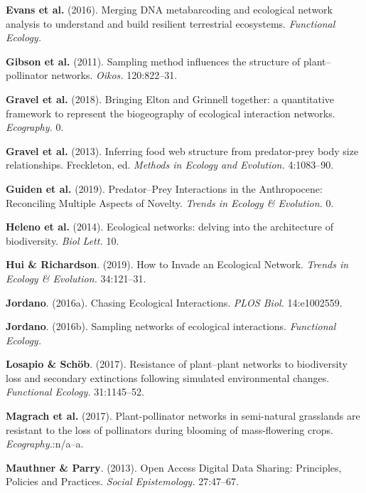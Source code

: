 \leavevmode\hypertarget{ref-EvanKits16}{}%
\textbf{Evans et al.} (2016). Merging DNA metabarcoding and ecological
network analysis to understand and build resilient terrestrial
ecosystems. \emph{Functional Ecology.}

\leavevmode\hypertarget{ref-GibsKnot11}{}%
\textbf{Gibson et al.} (2011). Sampling method influences the structure
of plant--pollinator networks. \emph{Oikos.} 120:822--31.

\leavevmode\hypertarget{ref-GravBais18}{}%
\textbf{Gravel et al.} (2018). Bringing Elton and Grinnell together: a
quantitative framework to represent the biogeography of ecological
interaction networks. \emph{Ecography.} 0.

\leavevmode\hypertarget{ref-GravPois13}{}%
\textbf{Gravel et al.} (2013). Inferring food web structure from
predator-prey body size relationships. Freckleton, ed. \emph{Methods in
Ecology and Evolution.} 4:1083--90.

\leavevmode\hypertarget{ref-GuidBart19}{}%
\textbf{Guiden et al.} (2019). Predator--Prey Interactions in the
Anthropocene: Reconciling Multiple Aspects of Novelty. \emph{Trends in
Ecology \& Evolution.} 0.

\leavevmode\hypertarget{ref-HeleGarc14}{}%
\textbf{Heleno et al.} (2014). Ecological networks: delving into the
architecture of biodiversity. \emph{Biol Lett.} 10.

\leavevmode\hypertarget{ref-HuiRich19}{}%
\textbf{Hui \& Richardson}. (2019). How to Invade an Ecological Network.
\emph{Trends in Ecology \& Evolution.} 34:121--31.

\leavevmode\hypertarget{ref-Jord16}{}%
\textbf{Jordano}. (2016a). Chasing Ecological Interactions. \emph{PLOS
Biol.} 14:e1002559.

\leavevmode\hypertarget{ref-Jord16a}{}%
\textbf{Jordano}. (2016b). Sampling networks of ecological interactions.
\emph{Functional Ecology.}

\leavevmode\hypertarget{ref-LosaScho17}{}%
\textbf{Losapio \& Schöb}. (2017). Resistance of plant--plant networks
to biodiversity loss and secondary extinctions following simulated
environmental changes. \emph{Functional Ecology.} 31:1145--52.

\leavevmode\hypertarget{ref-MagrHolz17}{}%
\textbf{Magrach et al.} (2017). Plant-pollinator networks in
semi-natural grasslands are resistant to the loss of pollinators during
blooming of mass-flowering crops. \emph{Ecography.}:n/a--a.

\leavevmode\hypertarget{ref-MautParr13}{}%
\textbf{Mauthner \& Parry}. (2013). Open Access Digital Data Sharing:
Principles, Policies and Practices. \emph{Social Epistemology.}
27:47--67.

